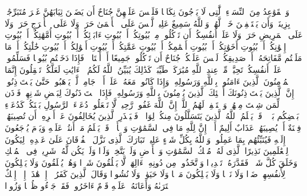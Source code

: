 \startbuffer[\q:24:60]
وَٱلۡقَوَٰعِدُ مِنَ ٱلنِّسَاۤءِ ٱلَّٰتِی لَا یَرۡجُونَ نِكَاحࣰا فَلَیۡسَ عَلَیۡهِنَّ جُنَاحٌ أَن یَضَعۡنَ ثِیَابَهُنَّ غَیۡرَ مُتَبَرِّجَٰتِۭ بِزِینَةࣲۖ وَأَن یَسۡتَعۡفِفۡنَ خَیۡرࣱ لَّهُنَّۗ وَٱللَّهُ سَمِیعٌ عَلِیمࣱ%
\stopbuffer%
\startbuffer[\q:24:61]
لَّیۡسَ عَلَى ٱلۡأَعۡمَىٰ حَرَجࣱ وَلَا عَلَى ٱلۡأَعۡرَجِ حَرَجࣱ وَلَا عَلَى ٱلۡمَرِیضِ حَرَجࣱ وَلَا عَلَىٰۤ أَنفُسِكُمۡ أَن تَأۡكُلُوا۟ مِنۢ بُیُوتِكُمۡ أَوۡ بُیُوتِ ءَابَاۤئِكُمۡ أَوۡ بُیُوتِ أُمَّهَٰتِكُمۡ أَوۡ بُیُوتِ إِخۡوَٰنِكُمۡ أَوۡ بُیُوتِ أَخَوَٰتِكُمۡ أَوۡ بُیُوتِ أَعۡمَٰمِكُمۡ أَوۡ بُیُوتِ عَمَّٰتِكُمۡ أَوۡ بُیُوتِ أَخۡوَٰلِكُمۡ أَوۡ بُیُوتِ خَٰلَٰتِكُمۡ أَوۡ مَا مَلَكۡتُم مَّفَاتِحَهُۥۤ أَوۡ صَدِیقِكُمۡۚ لَیۡسَ عَلَیۡكُمۡ جُنَاحٌ أَن تَأۡكُلُوا۟ جَمِیعًا أَوۡ أَشۡتَاتࣰاۚ فَإِذَا دَخَلۡتُم بُیُوتࣰا فَسَلِّمُوا۟ عَلَىٰۤ أَنفُسِكُمۡ تَحِیَّةࣰ مِّنۡ عِندِ ٱللَّهِ مُبَٰرَكَةࣰ طَیِّبَةࣰۚ كَذَٰلِكَ یُبَیِّنُ ٱللَّهُ لَكُمُ ٱلۡءَایَٰتِ لَعَلَّكُمۡ تَعۡقِلُونَ%
\stopbuffer%
\startbuffer[\q:24:62]
إِنَّمَا ٱلۡمُؤۡمِنُونَ ٱلَّذِینَ ءَامَنُوا۟ بِٱللَّهِ وَرَسُولِهِۦ وَإِذَا كَانُوا۟ مَعَهُۥ عَلَىٰۤ أَمۡرࣲ جَامِعࣲ لَّمۡ یَذۡهَبُوا۟ حَتَّىٰ یَسۡتَءۡذِنُوهُۚ إِنَّ ٱلَّذِینَ یَسۡتَءۡذِنُونَكَ أُو۟لَٰۤئِكَ ٱلَّذِینَ یُؤۡمِنُونَ بِٱللَّهِ وَرَسُولِهِۦۚ فَإِذَا ٱسۡتَءۡذَنُوكَ لِبَعۡضِ شَأۡنِهِمۡ فَأۡذَن لِّمَن شِئۡتَ مِنۡهُمۡ وَٱسۡتَغۡفِرۡ لَهُمُ ٱللَّهَۚ إِنَّ ٱللَّهَ غَفُورࣱ رَّحِیمࣱ%
\stopbuffer%
\startbuffer[\q:24:63]
لَّا تَجۡعَلُوا۟ دُعَاۤءَ ٱلرَّسُولِ بَیۡنَكُمۡ كَدُعَاۤءِ بَعۡضِكُم بَعۡضࣰاۚ قَدۡ یَعۡلَمُ ٱللَّهُ ٱلَّذِینَ یَتَسَلَّلُونَ مِنكُمۡ لِوَاذࣰاۚ فَلۡیَحۡذَرِ ٱلَّذِینَ یُخَالِفُونَ عَنۡ أَمۡرِهِۦۤ أَن تُصِیبَهُمۡ فِتۡنَةٌ أَوۡ یُصِیبَهُمۡ عَذَابٌ أَلِیمٌ%
\stopbuffer%
\startbuffer[\q:24:64]
أَلَاۤ إِنَّ لِلَّهِ مَا فِی ٱلسَّمَٰوَٰتِ وَٱلۡأَرۡضِۖ قَدۡ یَعۡلَمُ مَاۤ أَنتُمۡ عَلَیۡهِ وَیَوۡمَ یُرۡجَعُونَ إِلَیۡهِ فَیُنَبِّئُهُم بِمَا عَمِلُوا۟ۗ وَٱللَّهُ بِكُلِّ شَیۡءٍ عَلِیمُۢ%
\stopbuffer%
\startbuffer[\q:25:1]
تَبَارَكَ ٱلَّذِی نَزَّلَ ٱلۡفُرۡقَانَ عَلَىٰ عَبۡدِهِۦ لِیَكُونَ لِلۡعَٰلَمِینَ نَذِیرًا%
\stopbuffer%
\startbuffer[\q:25:2]
ٱلَّذِی لَهُۥ مُلۡكُ ٱلسَّمَٰوَٰتِ وَٱلۡأَرۡضِ وَلَمۡ یَتَّخِذۡ وَلَدࣰا وَلَمۡ یَكُن لَّهُۥ شَرِیكࣱ فِی ٱلۡمُلۡكِ وَخَلَقَ كُلَّ شَیۡءࣲ فَقَدَّرَهُۥ تَقۡدِیرࣰا%
\stopbuffer%
\startbuffer[\q:25:3]
وَٱتَّخَذُوا۟ مِن دُونِهِۦۤ ءَالِهَةࣰ لَّا یَخۡلُقُونَ شَیۡءࣰا وَهُمۡ یُخۡلَقُونَ وَلَا یَمۡلِكُونَ لِأَنفُسِهِمۡ ضَرࣰّا وَلَا نَفۡعࣰا وَلَا یَمۡلِكُونَ مَوۡتࣰا وَلَا حَیَوٰةࣰ وَلَا نُشُورࣰا%
\stopbuffer%
\startbuffer[\q:25:4]
وَقَالَ ٱلَّذِینَ كَفَرُوۤا۟ إِنۡ هَٰذَاۤ إِلَّاۤ إِفۡكٌ ٱفۡتَرَىٰهُ وَأَعَانَهُۥ عَلَیۡهِ قَوۡمٌ ءَاخَرُونَۖ فَقَدۡ جَاۤءُو ظُلۡمࣰا وَزُورࣰا%
